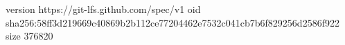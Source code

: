 version https://git-lfs.github.com/spec/v1
oid sha256:58ff3d219669c40869b2b112ce77204462e7532c041cb7b6f829256d2586f922
size 376820
